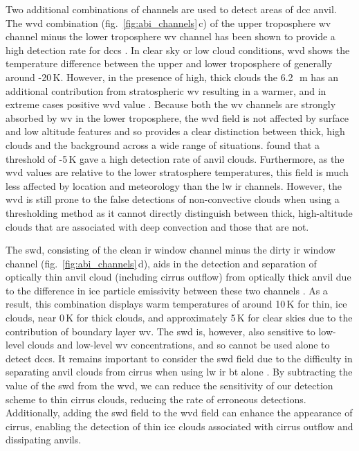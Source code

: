 Two additional combinations of channels are used to detect areas of \acrshort{dcc} anvil. 
The \acrfull{wvd} combination (fig.~\ref{fig:abi_channels}\,c) of the upper troposphere \acrshort{wv} channel minus the lower troposphere \acrshort{wv} channel has been shown to provide a high detection rate for \acrshort{dcc}s \citep{muller_role_2018, muller_novel_2019}.
In clear sky or low cloud conditions, \acrshort{wvd} shows the temperature difference between the upper and lower troposphere of generally around -20\,\unit{K}. 
However, in the presence of high, thick clouds the 6.2\,\unit{\mu m} has an additional contribution from stratospheric \acrshort{wv} resulting in a warmer, and in extreme cases positive \acrshort{wvd} value \citep{schmetz_monitoring_1997}.
Because both the \acrshort{wv} channels are strongly absorbed by \acrshort{wv} in the lower troposphere, the \acrshort{wvd} field is not affected by surface and low altitude features and so provides a clear distinction between thick, high clouds and the background across a wide range of situations.
\citet{muller_novel_2019} found that a threshold of -5\,\unit{K} gave a high detection rate of anvil clouds.
Furthermore, as the \acrshort{wvd} values are relative to the lower stratosphere temperatures, this field is much less affected by location and meteorology than the \acrshort{lw} \acrshort{ir} channels.
However, the \acrshort{wvd} is still prone to the false detections of non-convective clouds when using a thresholding method as it cannot directly distinguish between thick, high-altitude clouds that are associated with deep convection and those that are not.

The \acrfull{swd}, consisting of the clean \acrshort{ir} window channel minus the dirty \acrshort{ir} window channel (fig.~\ref{fig:abi_channels}\,d), aids in the detection and separation of optically thin anvil cloud (including cirrus outflow) from optically thick anvil due to the difference in ice particle emissivity between these two channels \citep{heidinger_gazing_2009}.
As a result, this combination displays warm temperatures of around 10\,\unit{K} for thin, ice clouds, near 0\,\unit{K} for thick clouds, and approximately 5\,\unit{K} for clear skies due to the contribution of boundary layer \acrshort{wv}.
The \acrshort{swd} is, however, also sensitive to low-level clouds and low-level \acrshort{wv} concentrations, and so cannot be used alone to detect \acrshort{dcc}s.
It remains important to consider the \acrshort{swd} field due to the difficulty in separating anvil clouds from cirrus when using \acrshort{lw} \acrshort{ir} \acrshort{bt} alone \citep{hong_detection_2005}. 
By subtracting the value of the \acrshort{swd} from the \acrshort{wvd}, we can reduce the sensitivity of our detection scheme to thin cirrus clouds, reducing the rate of erroneous detections.
Additionally, adding the \acrshort{swd} field to the \acrshort{wvd} field can enhance the appearance of cirrus, enabling the detection of thin ice clouds associated with cirrus outflow and dissipating anvils.

